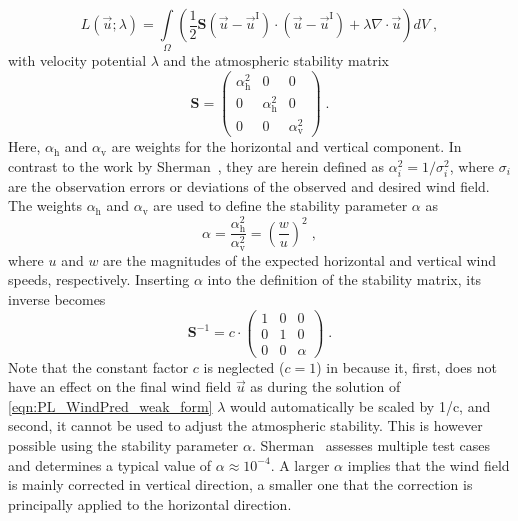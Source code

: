 \documentclass[twocolumn,letterpaper]{IEEEAerospaceCLS}
\def\pazocal#1{{#1}}
\newcommand{\matr}[1]{\bm{#1}}
\begin{document}
	\begin{equation}
	\pazocal{L}(\vec{u}; \lambda) = \int\limits_{\Omega} \left( \frac{1}{2} \matr{S} \left( \vec{u} - \vec{u}^\text{I} \right) \cdot \left( \vec{u} - \vec{u}^\text{I} \right) + \lambda \nabla \cdot \vec{u} \right)dV \; , 
	\label{eqn:PL_WindPred_functional}
	\end{equation}
with velocity potential $\lambda$ and the atmospheric stability matrix
	\begin{equation}
	\matr{S} = \begin{pmatrix}
	\alpha_\text{h}^2 & 0 & 0 \\ 0 & \alpha_\text{h}^2 & 0 \\ 0 & 0 & \alpha_\text{v}^2
	\end{pmatrix} \; .
	\label{eqn:PL_WindPred_stab_mat}
	\end{equation}
Here, $\alpha_\text{h}$ and $\alpha_\text{v}$ are weights for the horizontal and vertical component. In contrast to the work by Sherman~\cite{Sherman1978a}, they are herein defined as $\alpha_i^2=1/\sigma_i^2$, where $\sigma_i$ are the observation errors or deviations of the observed and desired wind field. The weights $\alpha_\text{h}$ and $\alpha_\text{v}$ are used to define the stability parameter $\alpha$ as 
	\begin{equation}
	\alpha = \frac{\alpha_\text{h}^2}{\alpha_\text{v}^2} = \left( \frac{w}{u} \right)^2 \; ,
	\end{equation}
where $u$ and $w$ are the magnitudes of the expected horizontal and vertical wind speeds, respectively. Inserting $\alpha$ into the definition of the stability matrix, its inverse becomes
	\begin{equation}
	\matr{S}^{-1} = c\cdot\begin{pmatrix}
	1 & 0 & 0 \\ 0 & 1 & 0 \\ 0 & 0 & \alpha
	\end{pmatrix} \; .
	\end{equation}
Note that the constant factor $c$ is neglected ($c=1$) in \cite{Walt2016,Mueller_MT_WindPrediction} because it, first, does not have an effect on the final wind field $\vec{u}$ as during the solution of \cref{eqn:PL_WindPred_weak_form} $\lambda$ would automatically be scaled by 1/c, and second, it cannot be used to adjust the atmospheric stability. This is however possible using the stability parameter $\alpha$. Sherman~\cite{Sherman1978a} assesses multiple test cases and determines a typical value of $\alpha \approx 10^{-4}$. A larger $\alpha$ implies that the wind field is mainly corrected in vertical direction, a smaller one that the correction is principally applied to the horizontal direction.
\end{document}
